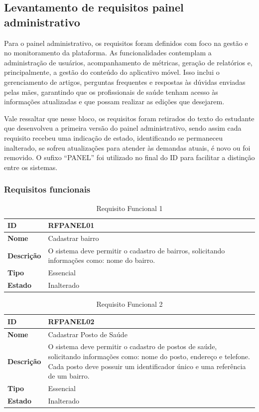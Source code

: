 \subsection{Levantamento de requisitos painel administrativo}

Para o painel administrativo, os requisitos foram definidos com foco na gestão e no monitoramento da plataforma. As funcionalidades contemplam a administração de usuários, acompanhamento de métricas, geração de relatórios e, principalmente, a gestão do conteúdo do aplicativo móvel. Isso inclui o gerenciamento de artigos, perguntas frequentes e respostas às dúvidas enviadas pelas mães, garantindo que os profissionais de saúde tenham acesso às informações atualizadas e que possam realizar as edições que desejarem.

Vale ressaltar que nesse bloco, os requisitos foram retirados do texto do estudante que desenvolveu a primeira versão do painel administrativo, sendo assim cada requisito recebeu uma indicação de estado, identificando se permaneceu inalterado, se sofreu atualizações para atender às demandas atuais, é novo ou foi removido. O sufixo ``PANEL'' foi utilizado no final do ID para facilitar a distinção entre os sistemas.

\subsubsection{Requisitos funcionais}

\begin{table}[H]
\centering
\begin{tabular}{|l|p{12cm}|}
\hline
\textbf{ID} & RFPANEL01 \\
\hline
\textbf{Nome} & Cadastrar bairro \\
\hline
\textbf{Descrição} & O sistema deve permitir o cadastro de bairros, solicitando informações como: nome do bairro. \\
\hline
\textbf{Tipo} & Essencial \\
\hline
\textbf{Estado} & Inalterado \\
\hline
\end{tabular}
\caption[RFPANEL01 -- Cadastrar bairro]{Requisito Funcional 1}
\label{tab:rfpanel01}
\end{table}

\begin{table}[H]
\centering
\begin{tabular}{|l|p{12cm}|}
\hline
\textbf{ID} & RFPANEL02 \\
\hline
\textbf{Nome} & Cadastrar Posto de Saúde \\
\hline
\textbf{Descrição} & O sistema deve permitir o cadastro de postos de saúde, solicitando informações como: nome do posto, endereço e telefone. Cada posto deve possuir um identificador único e uma referência de um bairro. \\
\hline
\textbf{Tipo} & Essencial \\
\hline
\textbf{Estado} & Inalterado \\
\hline
\end{tabular}
\caption[RFPANEL02 -- Cadastrar posto de saúde]{Requisito Funcional 2}
\label{tab:rfpanel02}
\end{table}

